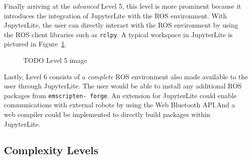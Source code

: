         Finally arriving at the \textit{advanced} Level 5, this level is more 
        prominent because it introduces the integration of JupyterLite with the 
        ROS environment. With JupyterLite, the user can directly interact with
        the ROS environment by using the ROS client libraries such as \texttt{rclpy}.
        A typical workspace in JupyterLite is pictured in Figure~\ref{fig:ui5}.

        \begin{figure}[htbp]
            \centering
            \caption{TODO Level 5 image}\label{fig:ui5}
        \end{figure}



        Lastly, Level 6 consists of a \textit{complete} ROS environment also made available to the user through JupyterLite. The user would be able to install any additional ROS packages from \texttt{emscripten- forge}. An extension for JupyterLite could enable communications with external robots by using the Web Bluetooth API.\@ And a web compiler could be implemented to directly build packages within JupyterLite.


    \subsection{Complexity Levels}

